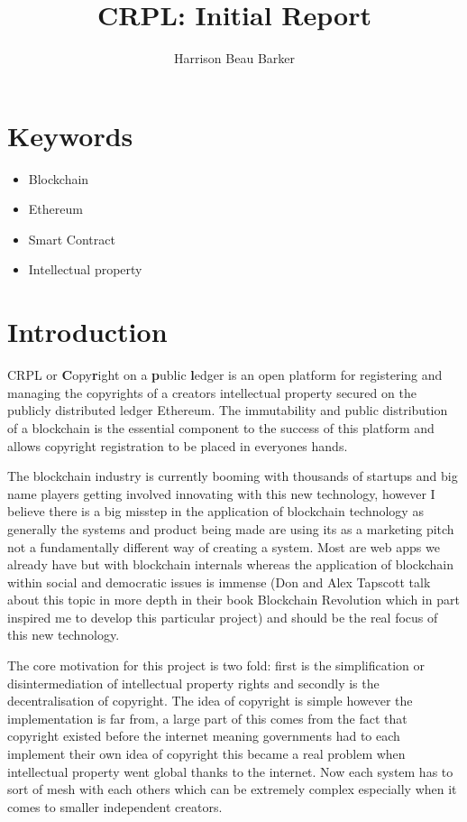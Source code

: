 \documentclass[11pt]{report}
\title{CRPL: Initial Report}
\author{Harrison Beau Barker}
\begin{document}
\maketitle
{}

\tableofcontents{}

\chapter{Keywords}

\begin{itemize}
  \item Blockchain
  \item Ethereum
  \item Smart Contract
  \item Intellectual property
\end{itemize}

\chapter{Introduction}

CRPL or \textbf{C}opy\textbf{r}ight on a \textbf{p}ublic \textbf{l}edger is an open platform for registering and managing the copyrights of a creators intellectual property secured on the publicly distributed ledger Ethereum. The immutability and public distribution of a blockchain is the essential component to the success of this platform and allows copyright registration to be placed in everyones hands.

The blockchain industry is currently booming with thousands of startups and big name players getting involved innovating with this new technology, however I believe there is a big misstep in the application of blockchain technology as generally the systems and product being made are using its as a marketing pitch not a fundamentally different way of creating a system. Most are web apps we already have but with blockchain internals whereas the application of blockchain within social and democratic issues is immense (Don and Alex Tapscott talk about this topic in more depth in their book Blockchain Revolution\cite{blockchain_revolution} which in part inspired me to develop this particular project) and should be the real focus of this new technology.

The core motivation for this project is two fold: first is the simplification or disintermediation of intellectual property rights and secondly is the decentralisation of copyright. The idea of copyright is simple however the implementation is far from, a large part of this comes from the fact that copyright existed before the internet meaning governments had to each implement their own idea of copyright this became a real problem when intellectual property went global thanks to the internet. Now each system has to sort of mesh with each others which can be extremely complex especially when it comes to smaller independent creators.
\end{document}
